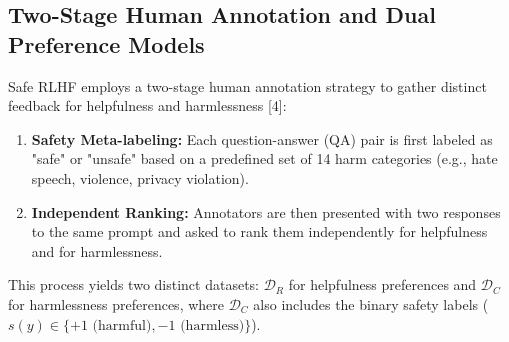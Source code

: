 \documentclass[10pt,journal,compsoc]{IEEEtran} %
\begin{document}
\subsection{Two-Stage Human Annotation and Dual Preference Models}
Safe RLHF employs a two-stage human annotation strategy to gather distinct feedback for helpfulness and harmlessness [4]:
\begin{enumerate}
    \item \textbf{Safety Meta-labeling:} Each question-answer (QA) pair is first labeled as "safe" or "unsafe" based on a predefined set of 14 harm categories (e.g., hate speech, violence, privacy violation).
    \item \textbf{Independent Ranking:} Annotators are then presented with two responses to the same prompt and asked to rank them independently for helpfulness and for harmlessness.
\end{enumerate}
This process yields two distinct datasets: $\mathcal{D}_R$ for helpfulness preferences and $\mathcal{D}_C$ for harmlessness preferences, where $\mathcal{D}_C$ also includes the binary safety labels ($s(y) \in \{+1 \text{ (harmful)}, -1 \text{ (harmless)}\}$).
\end{document}
